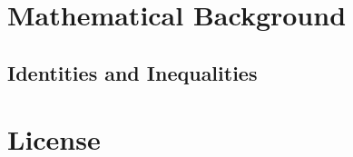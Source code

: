 \begin{appendices}

\chapter{Mathematical Background}\label{appendix:math}
\section{Identities and Inequalities}

\chapter{License}
\doclicenseFullText

\end{appendices}
